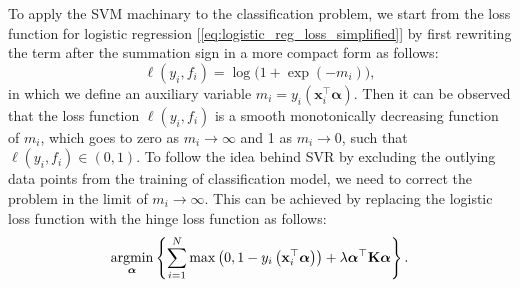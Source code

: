 To apply the SVM machinary to the classification problem, we start from the loss function for logistic regression [\cref{eq:logistic_reg_loss_simplified}] by first rewriting the term after the summation sign in a more compact form as follows:
\begin{equation}
    \label{eq:logistic_reg_loss_compact}
    \ell(y_i,f_i)=\log\big(1 + \exp(-m_i)\big),
\end{equation}
in which we define an auxiliary variable $m_i = y_i(\bm{x}_i^\top \boldsymbol{\alpha})$. Then it can be observed that the loss function $\ell(y_i,f_i)$ is a smooth monotonically decreasing function of $m_i$, which goes to zero as $m_i\to\infty$ and 1 as $m_i\to0$, such that $\ell(y_i,f_i) \in (0,1)$. To follow the idea behind SVR by excluding the outlying data points from the training of classification model, we need to correct the problem in the limit of $m_i\to\infty$. This can be achieved by replacing the logistic loss function with the hinge loss function as follows:
\begin{equation}
    \label{eq:SVM_classification_loss}
     \operatorname*{argmin}_{\boldsymbol{\alpha}} \left\{ \sum_{i=1}^N \max\left(0, 1 - y_i\left(\mathbf{x}_i^\top \boldsymbol{\alpha}\right)\right) + \lambda \boldsymbol{\alpha}^\top \mathbf{K} \boldsymbol{\alpha} \right\}.
\end{equation}